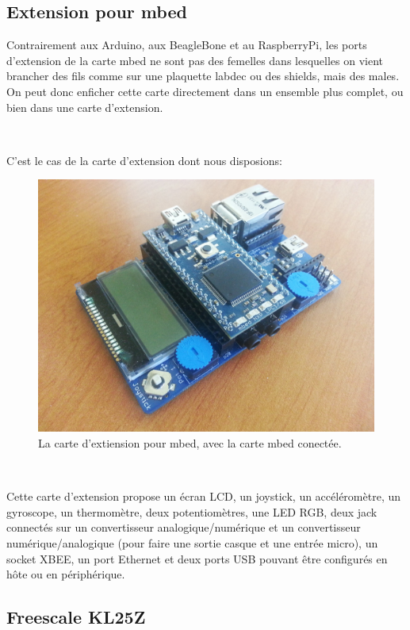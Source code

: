 \documentclass{article}
\begin{document}
\clearpage

\subsection{Extension pour mbed}
\label{mbed_ext}

Contrairement aux Arduino, aux BeagleBone et au RaspberryPi, les ports d’extension de la carte mbed ne sont pas des femelles dans lesquelles on vient brancher des fils comme sur une plaquette labdec ou des shields, mais des males. On peut donc enficher cette carte directement dans un ensemble plus complet, ou bien dans une carte d’extension.

~

C’est le cas de la carte d’extension dont nous disposions:

\begin{figure}[h!]
    \centering\includegraphics[width=\linewidth*2/3]{img/mbed_ext.jpg}
    \caption{La carte d’extiension pour mbed, avec la carte mbed conectée.}
\end{figure}

~

Cette carte d’extension propose un écran LCD, un joystick, un accéléromètre, un gyroscope, un thermomètre, deux potentiomètres, une LED RGB, deux jack connectés sur un convertisseur analogique/numérique et un convertisseur numérique/analogique (pour faire une sortie casque et une entrée micro), un socket XBEE, un port Ethernet et deux ports USB pouvant être configurés en hôte ou en périphérique.

\clearpage

\subsection{Freescale KL25Z}
\label{freescale}
\end{document}
